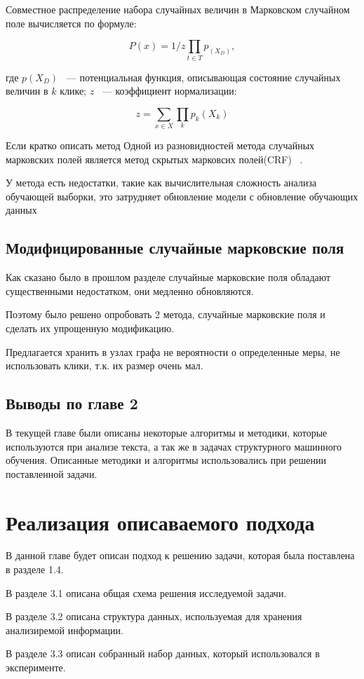 \documentclass[annotation,times,page4]{itmo-student-thesis}
\begin{document}
Совместное распределение набора случайных величин в Марковском случайном поле вычисляется по формуле:

\[
    P(x) = 1/z\prod_{t \in T} p_(X_{D}),
\]

где $p (X_{D})$ ~--- потенциальная функция, описывающая состояние случайных величин в $k$ клике; $z$ ~--- коэффициент нормализации:

\[
    z = \sum_{x \in X}\prod_{k} p_{k} (X_{k})
\]

Если кратко описать метод
Одной из разновидностей метода случайных марковских полей является метод скрытых марковсих полей(CRF) ~\cite{lafferty2001conditional, антоноваметод}.

У метода есть недостатки, такие как вычислительная сложность анализа обучающей выборки, это затрудняет обновление модели с обновление обучающих данных 
\section{Модифицированные случайные марковские поля}
Как сказано было в прошлом разделе случайные марковские поля обладают существенными недостатком, они медленно обновляются.

Поэтому было решено опробовать 2 метода, случайные марковские поля и сделать их упрощенную модификацию.

Предлагается хранить в узлах графа не вероятности о определенные меры, не использовать клики, т.к. их размер очень мал.

\section{Выводы по главе 2}
В текущей главе были описаны некоторые алгоритмы и методики, которые используются при анализе текста, а так же в задачах структурного машинного обучения. Описанные методики и алгоритмы использовались при решении поставленной задачи.
 
\chapter{Реализация описаваемого подхода}
В данной главе будет описан подход к решению задачи, которая была поставлена в разделе 1.4.

В разделе 3.1 описана общая схема решения исследуемой задачи. 

В разделе 3.2 описана структура данных, используемая для хранения анализиремой информации. 

В разделе 3.3 описан собранный набор данных, который использовался в эксперименте.
\end{document}
